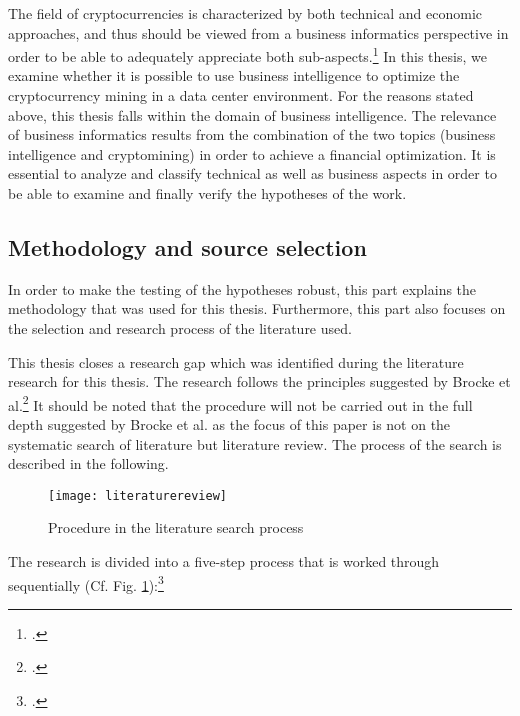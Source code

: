 The field of cryptocurrencies is characterized by both technical and economic approaches, and thus should be viewed from a business informatics
perspective in order to be able to adequately appreciate both sub-aspects.\footcite[Cf.][]{derks2018chaining} In this thesis, we examine
whether it is possible to use business intelligence to optimize the cryptocurrency mining in a data center environment.
For the reasons stated above, this thesis falls within the domain of business intelligence. The relevance of
business informatics results from the combination of the two topics (business intelligence and cryptomining) in order to achieve a
financial optimization. It is essential to analyze and classify technical as well as business aspects in order to
be able to examine and finally verify the hypotheses of the work.

\subsection{Methodology and source selection} \label{toc:methodikundquellenauswahl}

In order to make the testing of the hypotheses robust, this part explains the methodology that was used for this thesis.
Furthermore, this part also focuses on the selection and research process of the literature used.

This thesis closes a research gap which was identified during the literature research for this thesis.
The research follows the principles suggested by Brocke et al.\footcite[Cf.][]{brocke2009reconstructing}
It should be noted that the procedure will not be carried out in the full depth suggested by Brocke et al. as the
focus of this paper is not on the systematic search of literature but literature review. The process of the search is described in the following. 

\begin{figure}[H] 
    \caption{Procedure in the literature search process} 
    \texttt{[image: literaturereview]} 
    \label{figure:literaturereview} 
    \\ 
    \cite[Source: Based on][Fig. 3]{brocke2009reconstructing} 
\end{figure} 

The research is divided into a five-step process that is worked through sequentially
(Cf. Fig. \ref{figure:literaturereview}):\footcite[Cf.][pp. 2211]{brocke2009reconstructing} 

